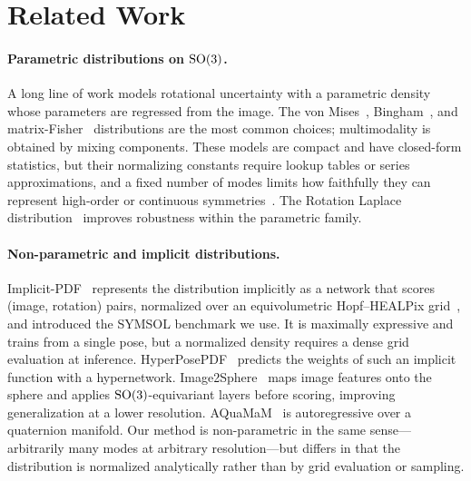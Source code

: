 \section{Related Work}
\label{sec:related}

\paragraph{Parametric distributions on \texorpdfstring{$\mathrm{SO}(3)$}{SO(3)}.}
A long line of work models rotational uncertainty with a parametric density whose
parameters are regressed from the image. The von
Mises~\cite{prokudin2018deep}, Bingham~\cite{gilitschenski2019deep,deng2022bingham},
and matrix-Fisher~\cite{mohlin2020matrixfisher} distributions are the most common
choices; multimodality is obtained by mixing components. These models are compact and have closed-form statistics,
but their normalizing constants require lookup tables or series approximations,
and a fixed number of modes limits how faithfully they can represent high-order
or continuous symmetries~\cite{murphy2021ipdf}. The Rotation
Laplace distribution~\cite{yin2023rotationlaplace} improves robustness within the
parametric family.

\paragraph{Non-parametric and implicit distributions.}
Implicit-PDF~\cite{murphy2021ipdf} represents the distribution implicitly as a
network that scores (image, rotation) pairs, normalized over an equivolumetric
Hopf--HEALPix grid~\cite{yershova2010so3grids,gorski2005healpix}, and introduced the SYMSOL benchmark we use.
It is maximally expressive and trains from a single pose, but a normalized
density requires a dense grid evaluation at inference. HyperPosePDF~\cite{hofer2023hyperposepdf}
predicts the weights of such an implicit function with a hypernetwork.
Image2Sphere~\cite{klee2023image2sphere} maps image features onto the sphere and
applies $\mathrm{SO}(3)$-equivariant layers before scoring, improving generalization at
a lower resolution. AQuaMaM~\cite{alcorn2023aquamam} is autoregressive over a
quaternion manifold. Our method is non-parametric in the same sense---arbitrarily
many modes at arbitrary resolution---but differs in that the distribution is
normalized analytically rather than by grid evaluation or sampling.

